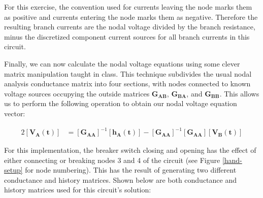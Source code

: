 \documentclass[10pt, oneside, letterpaper]{article}
\begin{document}
For this exercise, the convention used for currents leaving the node marks them as positive and currents entering the node marks them as negative. Therefore the resulting branch currents are the nodal voltage divided by the branch resistance, minus the discretized component current sources for all branch currents in this circuit.

Finally, we can now calculate the nodal voltage equations using some clever matrix manipulation taught in class. This technique subdivides the usual nodal analysis conductance matrix into four sections, with nodes connected to known voltage sources occupying the outside matrices $\mathbf{G_{AB}}$, $\mathbf{G_{BA}}$, and $\mathbf{G_{BB}}$. This allows us to perform the following operation to obtain our nodal voltage equation vector:

\begin{alignat}{2}
\left[\mathbf{V_A(t)}\right] &= \left[\mathbf{G_{AA}}\right]^{-1}\left[\mathbf{h_A(t)}\right] - \left[\mathbf{G_{AA}}\right]^{-1}\left[\mathbf{G_{AA}}\right]\left[\mathbf{V_B(t)}\right]
\end{alignat}

For this implementation, the breaker switch closing and opening has the effect of either connecting or breaking nodes 3 and 4 of the circuit (see Figure \ref{hand-setup} for node numbering). This has the result of generating two different conductance and history matrices. Shown below are both conductance and history matrices used for this circuit's solution:
\end{document}
